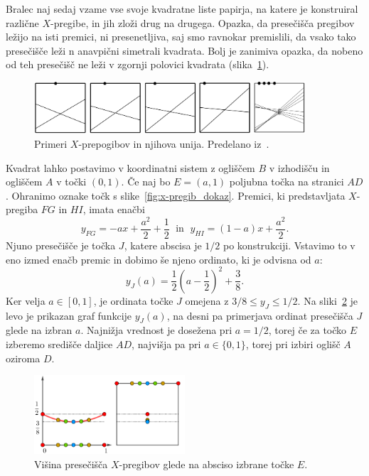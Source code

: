 Bralec naj sedaj vzame vse svoje kvadratne liste papirja, na katere je konstruiral različne $X$-pregibe, in jih zloži drug na drugega. Opazka, da presečišča pregibov ležijo na isti premici, ni presenetljiva, saj smo ravnokar premislili, da vsako tako presečišče leži n anavpični simetrali kvadrata. Bolj je zanimiva opazka, da nobeno od teh presečišč ne leži v zgornji polovici kvadrata (slika~\ref{fig:x-pregib_primeri_skup}).

\begin{figure}[h]
    \centering
    \includegraphics[width=0.9\textwidth]{images/x-pregibi/primeri_skupaj.png}
    \caption[Primeri $X$-pregibov]{Primeri $X$-prepogibov in njihova unija. Predelano iz~\cite[str.\ 36]{haga2008}.}
    \label{fig:x-pregib_primeri_skup}
\end{figure}

Kvadrat lahko postavimo v koordinatni sistem z ogliščem $B$ v izhodišču in ogliščem $A$ v točki $(0,1)$. Če naj bo $E = (a, 1)$ poljubna točka na stranici $AD$. Ohranimo oznake točk s slike~\ref{fig:x-pregib_dokaz}. Premici, ki predstavljata $X$-pregiba $FG$ in $HI$, imata enačbi
$$ y_{FG} = -ax + \frac{a^2}{2} + \frac{1}{2} \; \text{ in } \; y_{HI} = (1-a)x + \frac{a^2}{2}. $$
Njuno presečišče je točka $J$, katere abscisa je $1/2$ po konstrukciji. Vstavimo to v eno izmed enačb premic in dobimo še njeno ordinato, ki je odvisna od $a$:
$$ y_J(a) = \frac{1}{2} \left(a - \frac{1}{2}\right)^2 + \frac{3}{8}. $$
Ker velja $a \in [0,1]$, je ordinata točke $J$ omejena z $3/8 \leq y_J \leq 1/2$. Na sliki~\ref{fig:x-pregib_visina_pres} je levo je prikazan graf funkcije $y_J(a)$, na desni pa primerjava ordinat presečišča $J$ glede na izbran $a$. Najnižja vrednost je dosežena pri $a = 1/2$, torej če za točko $E$ izberemo središče daljice $AD$, najvišja pa pri $a \in \{0, 1\}$, torej pri izbiri oglišč $A$ oziroma $D$.
\begin{figure}[h]
    \centering
    \includegraphics[width=0.5\textwidth]{images/x-pregibi/visina_presecisca.png}
    \caption[Višina presečišča $X$-pregibov]{Višina presečišča $X$-pregibov glede na absciso izbrane točke $E$.}
    \label{fig:x-pregib_visina_pres}
\end{figure}

